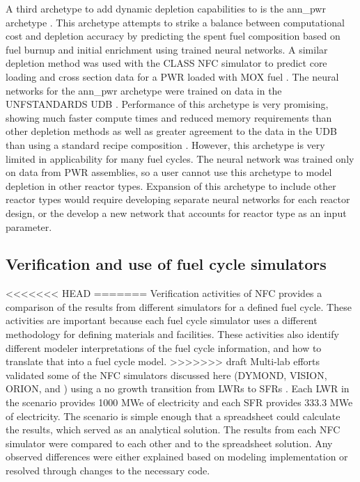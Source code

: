 A third archetype to add dynamic depletion capabilities to \Cyclus 
is the ann\_pwr archetype \cite{bae_deep_2020}. This archetype 
attempts to strike a balance between computational cost and 
depletion accuracy by predicting the spent fuel composition based on 
fuel burnup and initial enrichment using trained neural networks.
A similar depletion method was used with the \gls{CLASS} 
\gls{NFC} simulator to predict core loading and cross section data 
for a \gls{PWR} loaded with \gls{MOX} fuel \cite{leniau_neural_2015}.
The neural networks for the ann\_pwr archetype were trained 
on data in the \gls{UNFSTANDARDS} \gls{UDB} \cite{peterson_used_2013}.
Performance of this archetype is very promising, showing much faster 
compute times and reduced memory requirements than other depletion 
methods as well as greater agreement to the data in the \gls{UDB} than 
using a standard recipe composition \cite{bae_deep_2020}. However, 
this archetype is very limited in applicability for many fuel cycles. 
The neural network was trained only on data from \gls{PWR}
assemblies, so a user cannot use this archetype to model depletion 
in other reactor types. Expansion of this archetype to include 
other reactor types would require developing separate neural networks for 
each reactor design, or the develop a new network that accounts for 
reactor type as an input parameter. 

\subsection{Verification and use of fuel cycle simulators}
<<<<<<< HEAD
=======
Verification activities of \gls{NFC} provides a comparison of the 
results from different simulators for a defined fuel cycle. 
These activities are important because each fuel cycle 
simulator uses a different methodology for defining materials 
and facilities. These activities also identify different 
modeler interpretations of the fuel cycle information, 
and how to translate that into a fuel cycle model. 
>>>>>>> draft
Multi-lab efforts validated some of the \gls{NFC} simulators discussed here 
(\gls{DYMOND}, \gls{VISION}, ORION, and \Cyclus)
using a no growth transition from \glspl{LWR} 
to \glspl{SFR} \cite{feng_standardized_2016,bae_standardized_2019}.
Each \gls{LWR} in the scenario provides 1000 MWe of 
electricity and each \gls{SFR} provides 333.3 MWe of electricity. The 
scenario is simple enough that a spreadsheet could calculate the results, 
which served as an analytical solution. The 
results from each \gls{NFC} simulator were compared to each other and 
to the spreadsheet solution. Any observed differences were either explained 
based on modeling implementation or resolved through changes to the 
necessary code.

